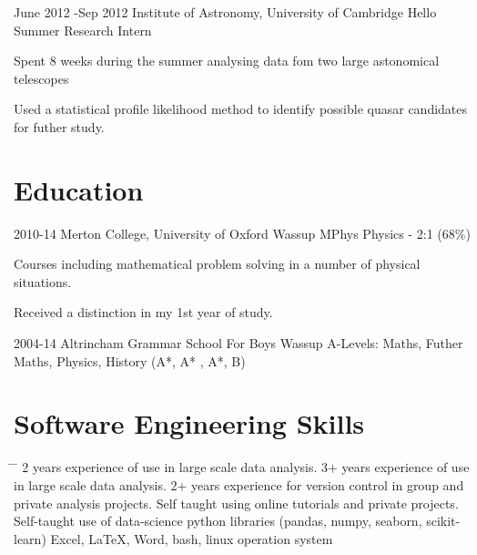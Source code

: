 \documentclass[10pt]{article} %
\begin{document}
\job
{June 2012 -}{Sep 2012}
{Institute of Astronomy, University of Cambridge}
{Hello}
{Summer Research Intern}
{\begin{itemize-noindent}
  \item{Spent 8 weeks during the summer analysing data fom two large astonomical telescopes}
  \item{Used a statistical profile likelihood method to identify possible quasar candidates for futher study.}
 \end{itemize-noindent}}

\section{Education}

\job
{2010-14}{}
{Merton College, University of Oxford}
{Wassup}
{MPhys Physics - 2:1 (68\%) }
{
\begin{itemize-noindent}
\item{Courses including mathematical problem solving in a number of physical situations.}
\item{Received a distinction in my 1st year of study.}
\end{itemize-noindent}
}

\job
{2004-14}{}
{Altrincham Grammar School For Boys}
{Wassup}
{A-Levels: Maths, Futher Maths, Physics, History (A*, A* , A*, B)}
{\vspace{-1em}}





\section{Software Engineering Skills}
\begin{tabbing}
  \hspace{2mm} \= \hspace{25mm} \= \kill 
        {2 years experience of use in large scale data analysis.}
           {3+ years experience of use in large scale data analysis.}
        {2+ years experience for version control in group and private analysis projects.}
           {Self taught using online tutorials and private projects.}
   {Self-taught use of data-science python libraries (pandas, numpy, seaborn, scikit-learn)}
         {Excel, LaTeX, Word, bash, linux operation system}
\end{tabbing}
\end{document}

